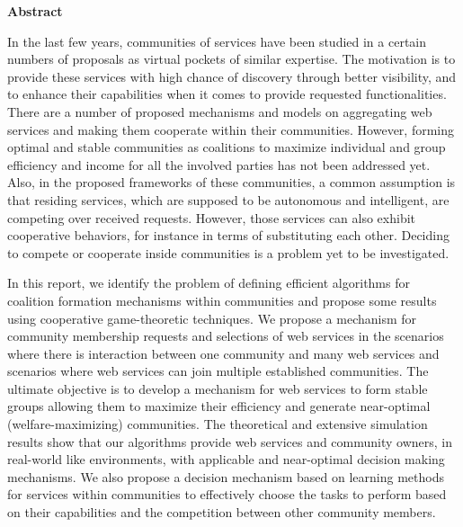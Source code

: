 \begin{center}
{\LARGE\textbf{Abstract}}
\end{center}

In the last few years, communities of services have been studied in a certain numbers of proposals as virtual pockets of similar expertise. The motivation is to provide these services with high chance of discovery through better visibility, and to enhance their capabilities when it comes to provide requested functionalities. There are a number of proposed mechanisms and models on aggregating web services and making them cooperate within their communities. However, forming optimal and stable communities as coalitions to maximize individual and group efficiency and income for all the involved parties has not been addressed yet. Also, in the proposed frameworks of these communities, a common assumption is that residing services, which are supposed to be autonomous and intelligent, are competing over received requests. However, those services can also exhibit cooperative behaviors, for instance in terms of substituting each other. Deciding to compete or cooperate inside communities is a problem yet to be investigated.

In this report, we identify the problem of defining efficient algorithms for coalition formation mechanisms within communities and propose some results using cooperative game-theoretic techniques. We propose a mechanism for community membership requests and selections of web services in the scenarios where there is interaction between one community and many web services and scenarios where web services can join multiple established communities. The ultimate objective is to develop a mechanism for web services to form stable groups allowing them to maximize their efficiency and generate near-optimal (welfare-maximizing) communities. The theoretical and extensive simulation results show that our algorithms provide web services and community owners, in real-world like environments, with applicable and near-optimal decision making mechanisms. We also propose a decision mechanism based on learning methods for services within communities to effectively choose the tasks to perform based on their capabilities and the competition between other community members.























